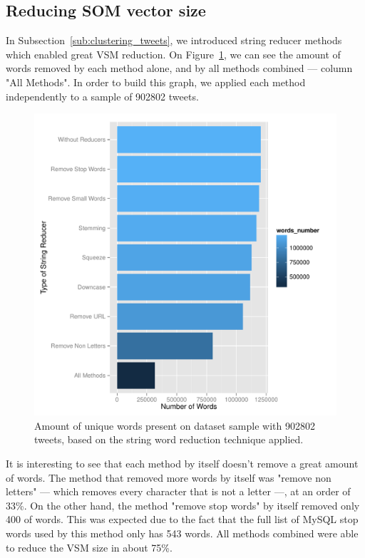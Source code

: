 \documentclass[journal]{IEEEtran}
\begin{document}
\subsection{Reducing SOM vector size}
\label{sub:reducing_som_vector_size}
In Subsection~\ref{sub:clustering_tweets}, we introduced string reducer methods which enabled great \ac{VSM} reduction. On Figure~\ref{fig:plot_word_red}, we can see the amount of words removed by each method alone, and by all methods combined --- column "All Methods". In order to build this graph, we applied each method independently to a sample of 902802 tweets.

\begin{figure}[h]
  \centering
  \includegraphics[width=1\linewidth]{./plots/svm/plot_wordcount.pdf}
  \caption{Amount of unique words present on dataset sample with 902802 tweets, based on the string word reduction technique applied.}
  \label{fig:plot_word_red}
\end{figure}

It is interesting to see that each method by itself doesn't remove a great amount of words. The method that removed more words by itself was "remove non letters" --- which removes every character that is not a letter ---, at an order of 33\%. On the other hand, the method "remove stop words" by itself removed only 400 of words. This was expected due to the fact that the full list of MySQL stop words used by this method only has 543 words. All methods combined were able to reduce the \ac{VSM} size in about 75\%.
\end{document}
